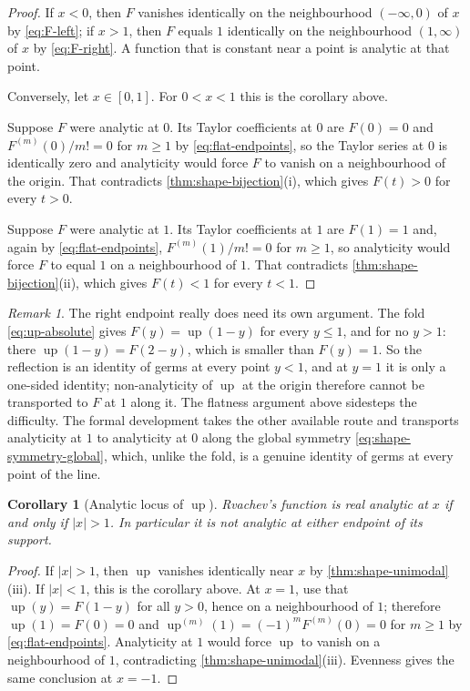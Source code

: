 \documentclass[11pt,oneside]{article}
\newtheorem{corollary}[theorem]{Corollary}
\theoremstyle{definition}
\theoremstyle{remark}
\newtheorem{remark}[theorem]{Remark}
\newcommand{\Up}{\operatorname{up}}
\begin{document}
\begin{proof}
If $x<0$, then $F$ vanishes identically on the neighbourhood $(-\infty,0)$ of $x$ by
\eqref{eq:F-left}; if $x>1$, then $F$ equals $1$ identically on the neighbourhood
$(1,\infty)$ of $x$ by \eqref{eq:F-right}.  A function that is constant near a point is
analytic at that point.

Conversely, let $x\in[0,1]$.  For $0<x<1$ this is the corollary above.

Suppose $F$ were analytic at $0$.  Its Taylor coefficients at $0$ are $F(0)=0$ and
$F^{(m)}(0)/m!=0$ for $m\ge1$ by \eqref{eq:flat-endpoints}, so the Taylor series at $0$ is
identically zero and analyticity would force $F$ to vanish on a neighbourhood of the origin.
That contradicts \cref{thm:shape-bijection}(i), which gives $F(t)>0$ for every $t>0$.

Suppose $F$ were analytic at $1$.  Its Taylor coefficients at $1$ are $F(1)=1$ and, again by
\eqref{eq:flat-endpoints}, $F^{(m)}(1)/m!=0$ for $m\ge1$, so analyticity would force $F$ to
equal $1$ on a neighbourhood of $1$.  That contradicts \cref{thm:shape-bijection}(ii), which
gives $F(t)<1$ for every $t<1$.
\end{proof}

\begin{remark}
The right endpoint really does need its own argument.  The fold \eqref{eq:up-absolute} gives
$F(y)=\Up(1-y)$ for every $y\le1$, and for no $y>1$: there $\Up(1-y)=F(2-y)$, which is
smaller than $F(y)=1$.  So the reflection is an identity of germs at every point $y<1$, and at
$y=1$ it is only a one-sided identity; non-analyticity of $\Up$ at the origin therefore cannot
be transported to $F$ at $1$ along it.  The flatness argument above sidesteps the difficulty.
The formal development takes the other available route and transports analyticity at $1$ to
analyticity at $0$ along the global symmetry \eqref{eq:shape-symmetry-global}, which, unlike
the fold, is a genuine identity of germs at every point of the line.
\end{remark}

\begin{corollary}[Analytic locus of $\Up$]
\label{thm:shape-analytic-locus-up}
Rvachev's function is real analytic at $x$ if and only if $|x|>1$.  In particular it is not
analytic at either endpoint of its support.
\end{corollary}

\begin{proof}
If $|x|>1$, then $\Up$ vanishes identically near $x$ by \cref{thm:shape-unimodal}(iii).  If
$|x|<1$, this is the corollary above.  At $x=1$, use that $\Up(y)=F(1-y)$ for all $y>0$, hence
on a neighbourhood of $1$; therefore $\Up(1)=F(0)=0$ and $\Up^{(m)}(1)=(-1)^mF^{(m)}(0)=0$ for
$m\ge1$ by \eqref{eq:flat-endpoints}.  Analyticity at $1$ would force $\Up$ to vanish on a
neighbourhood of $1$, contradicting \cref{thm:shape-unimodal}(iii).  Evenness gives the same
conclusion at $x=-1$.
\end{proof}
\end{document}
